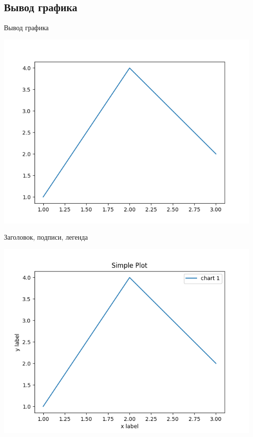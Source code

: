 \documentclass[12pt]{beamer}
\begin{document}
\subsection{Вывод графика}
\begin{frame}{Вывод графика}

\vspace{0cm}
\includegraphics[scale=0.35]{code_04/41.png}
\end{frame}


\begin{frame}{Заголовок, подписи, легенда}

\vspace{0cm}
\includegraphics[scale=0.35]{code_04/42.png}
\end{frame}
\end{document}
